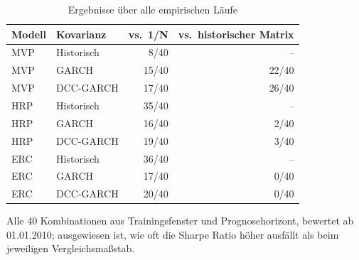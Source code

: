 \begin{table}[htbp]
  \centering
  \footnotesize
  \begin{tabular}{llrr}
    \toprule
    Modell & Kovarianz & vs.\ 1/N & vs.\ historischer Matrix \\
    \midrule
    MVP & Historisch & 8/40 & -- \\
    MVP & GARCH & 15/40 & 22/40 \\
    MVP & DCC-GARCH & 17/40 & 26/40 \\
    \midrule
    HRP & Historisch & 35/40 & -- \\
    HRP & GARCH & 16/40 & 2/40 \\
    HRP & DCC-GARCH & 19/40 & 3/40 \\
    \midrule
    ERC & Historisch & 36/40 & -- \\
    ERC & GARCH & 17/40 & 0/40 \\
    ERC & DCC-GARCH & 20/40 & 0/40 \\
    \bottomrule
  \end{tabular}
  \caption{Ergebnisse über alle empirischen Läufe}
  \label{tab:bilanz}
  \begin{minipage}{\linewidth}\vspace{0.4em}\centering\footnotesize
  Alle 40 Kombinationen aus Trainingsfenster und Prognosehorizont, bewertet ab 01.01.2010; ausgewiesen ist, wie oft die Sharpe Ratio höher ausfällt als beim jeweiligen Vergleichsmaßstab.
  \end{minipage}
\end{table}
